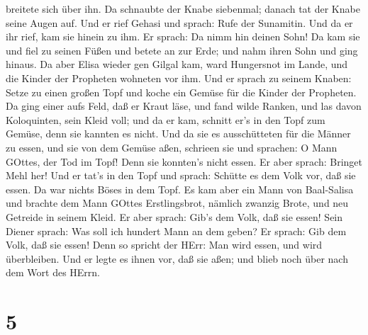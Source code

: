 breitete sich über ihn. Da schnaubte der Knabe siebenmal; danach tat der
Knabe seine Augen auf.  Und er rief Gehasi und sprach: Rufe
der Sunamitin. Und da er ihr rief, kam sie hinein zu ihm. Er sprach: Da
nimm hin deinen Sohn!  Da kam sie und fiel zu seinen Füßen
und betete an zur Erde; und nahm ihren Sohn und ging hinaus.
 Da aber Elisa wieder gen Gilgal kam, ward Hungersnot im
Lande, und die Kinder der Propheten wohneten vor ihm. Und er sprach zu
seinem Knaben: Setze zu einen großen Topf und koche ein Gemüse für die
Kinder der Propheten.  Da ging einer aufs Feld, daß er
Kraut läse, und fand wilde Ranken, und las davon Koloquinten, sein Kleid
voll; und da er kam, schnitt er's in den Topf zum Gemüse, denn sie
kannten es nicht.  Und da sie es ausschütteten für die
Männer zu essen, und sie von dem Gemüse aßen, schrieen sie und sprachen:
O Mann GOttes, der Tod im Topf! Denn sie konnten's nicht essen.
 Er aber sprach: Bringet Mehl her! Und er tat's in den Topf
und sprach: Schütte es dem Volk vor, daß sie essen. Da war nichts Böses
in dem Topf.  Es kam aber ein Mann von Baal-Salisa und
brachte dem Mann GOttes Erstlingsbrot, nämlich zwanzig Brote, und neu
Getreide in seinem Kleid. Er aber sprach: Gib's dem Volk, daß sie essen!
 Sein Diener sprach: Was soll ich hundert Mann an dem
geben? Er sprach: Gib dem Volk, daß sie essen! Denn so spricht der HErr:
Man wird essen, und wird überbleiben.  Und er legte es
ihnen vor, daß sie aßen; und blieb noch über nach dem Wort des HErrn.

\hypertarget{section-4}{%
\section{5}\label{section-4}}

